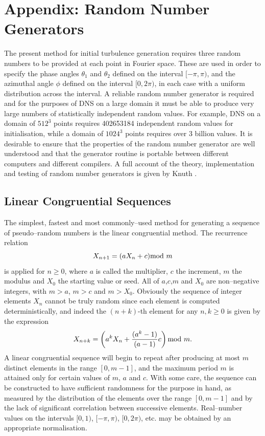 \documentclass[dvips]{article}
\begin{document}
\newpage
\section*{Appendix: Random Number Generators}
The present method for initial turbulence generation requires 
three random numbers to be provided at each point in Fourier space.
These are used in order to specify the phase angles
$\theta_{1}$ and $\theta_{2}$ defined on the interval $[-\pi,\pi)$,
and the azimuthal angle $\phi$ defined on the
interval $[0,2\pi)$, in each case with a uniform distribution across the
interval.  A reliable random number generator is required and for the
purposes of DNS on a large domain it must be
able to produce very large numbers of statistically independent random values.
For example, DNS on a domain of $512^{3}$ points requires
402653184 independent random values for initialisation, while a domain
of $1024^{3}$ points requires over 3 billion values.  It is desirable to
ensure that the properties of the random number generator are well
understood and that the generator routine is portable between different
computers and different compilers.
A full account of the theory, implementation and testing of random
number generators is given by Knuth \cite{knuth}.

\subsection*{Linear Congruential Sequences}
The simplest, fastest and most commonly--used  method for generating a sequence
of pseudo--random numbers is the linear congruential method.  The recurrence
relation
\begin{equation}
X_{n+1} = (aX_{n} + c) {\rm mod} \ m
\end{equation}
is applied for $n\ge 0$, where $a$ is called the multiplier, $c$ the increment,
$m$ the modulus and $X_0$ the starting value or seed.  All of
$a$,$c$,$m$ and $X_{0}$ are non--negative integers, with $m>a$, $m>c$ and
$m>X_{0}$.  Obviously the sequence of integer elements $X_{n}$ cannot be
truly random since each element is computed deterministically, and indeed the
$(n+k)$-th element for any $n,k \ge 0$ is given by the expression
\begin{equation}
X_{n+k} = \left(a^{k}X_{n} + \frac{(a^{k}-1)}{(a-1)}c\right) {\rm mod} \ m.
\label{recurgen}
\end{equation}
A linear congruential sequence will begin to repeat after producing at most $m$
distinct elements in the range $[0,m-1]$, and the maximum period $m$ is
attained only for certain values of $m$, $a$ and $c$.  With some care,
the sequence can be constructed to have sufficient
randomness for the purpose in hand, as measured by the distribution
of the elements
over the range $[0,m-1]$ and by the lack of significant correlation between
successive elements.  Real--number values on the intervals $[0,1)$,
$[-\pi,\pi)$, $[0,2\pi)$, etc. may be obtained by an appropriate 
normalisation.
\end{document}
